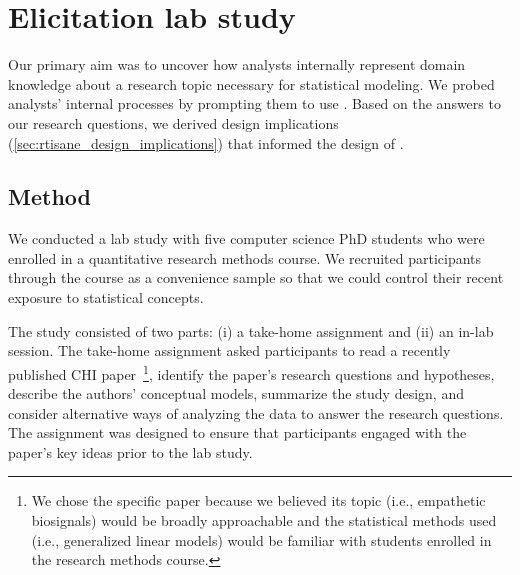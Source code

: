 \def\unit{\texttt{Unit}\xspace}
\def\measure{\texttt{Measure}\xspace}
\def\setup{\texttt{SetUp}\xspace}

\section{Elicitation lab study} \label{sec:exploratoryStudy}
Our primary aim was to uncover how analysts internally represent domain
knowledge about a research topic necessary for statistical modeling. We probed
analysts' internal processes by prompting them to use \tisane. Based on the
answers to our research questions, we derived design implications
(\autoref{sec:rtisane_design_implications}) that informed the design of \rTisane.

\subsection{Method}
We conducted a lab study with five computer science PhD students who were
enrolled in a quantitative research methods course. We recruited participants
through the course as a convenience sample so that we could control their recent
exposure to statistical concepts. 

The study consisted of two parts: (i) a take-home assignment and (ii) an in-lab
session. The take-home assignment asked participants to read a recently
published CHI paper~\cite{winters2021heartbeat}\footnote{We chose the specific
paper because we believed its topic (i.e., empathetic biosignals) would be
broadly approachable and the statistical methods used (i.e., generalized linear
models) would be familiar with students enrolled in the research methods course.}, identify the paper's research
questions and hypotheses, describe the authors' conceptual models, summarize the
study design, and consider alternative ways of analyzing the data to answer the
research questions. The assignment was designed to ensure that participants
engaged with the paper's key ideas prior to the lab study.

